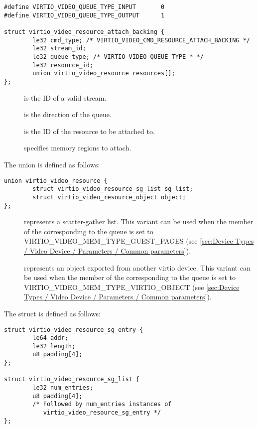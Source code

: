 \begin{lstlisting}
#define VIRTIO_VIDEO_QUEUE_TYPE_INPUT       0
#define VIRTIO_VIDEO_QUEUE_TYPE_OUTPUT      1

struct virtio_video_resource_attach_backing {
        le32 cmd_type; /* VIRTIO_VIDEO_CMD_RESOURCE_ATTACH_BACKING */
        le32 stream_id;
        le32 queue_type; /* VIRTIO_VIDEO_QUEUE_TYPE_* */
        le32 resource_id;
        union virtio_video_resource resources[];
};
\end{lstlisting}

\begin{description}
\item[]
is the ID of a valid stream.
\item[]
is the direction of the queue.
\item[]
is the ID of the resource to be attached to.
\item[]
specifies memory regions to attach.
\end{description}

The union  is defined as follows:

\begin{lstlisting}
union virtio_video_resource {
        struct virtio_video_resource_sg_list sg_list;
        struct virtio_video_resource_object object;
};
\end{lstlisting}

\begin{description}
\item[]
represents a scatter-gather list. This variant can be used when the
 member of the 
corresponding to the queue is set to
VIRTIO_VIDEO_MEM_TYPE_GUEST_PAGES (see
\ref{sec:Device Types / Video Device / Parameters / Common parameters}).
\item[]
represents an object exported from another virtio device. This variant
can be used when the  member of the
 corresponding to the queue is set
to VIRTIO_VIDEO_MEM_TYPE_VIRTIO_OBJECT (see
\ref{sec:Device Types / Video Device / Parameters / Common parameters}).
\end{description}

The struct  is defined as follows:

\begin{lstlisting}
struct virtio_video_resource_sg_entry {
        le64 addr;
        le32 length;
        u8 padding[4];
};

struct virtio_video_resource_sg_list {
        le32 num_entries;
        u8 padding[4];
        /* Followed by num_entries instances of
           virtio_video_resource_sg_entry */
};
\end{lstlisting}

